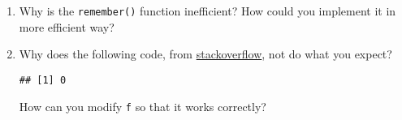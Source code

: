 \begin{enumerate}
\begin{Shaded}
\begin{Highlighting}[]
\StringTok{ }\NormalTok{(}\NormalTok{(}\NormalTok{, }\NormalTok{(}
\StringTok{ }\NormalTok{(}\NormalTok{, }\NormalTok{(}\NormalTok{(}
\StringTok{ }\NormalTok{(}\NormalTok{, }\NormalTok{(}\NormalTok{, }
\end{Highlighting}
\end{Shaded}
\item
  Why is the \texttt{remember()} function inefficient? How could you
  implement it in more efficient way?
\item
  Why does the following code, from
  \href{http://stackoverflow.com/questions/8440675}{stackoverflow}, not
  do what you expect?

\begin{Shaded}
\begin{Highlighting}[]
\StringTok{ }\OperatorTok{*}\StringTok{ }\OperatorTok{+}\StringTok{ }

\StringTok{ } \NormalTok{(}\NormalTok{, }\NormalTok{), } \NormalTok{(}\NormalTok{, }\NormalTok{))}

\NormalTok{fs[[}\NormalTok{]](}\NormalTok{)}
\end{Highlighting}
\end{Shaded}

\begin{verbatim}
## [1] 0
\end{verbatim}

\begin{Shaded}
\begin{Highlighting}[]
\end{Highlighting}
\end{Shaded}

  How can you modify \texttt{f} so that it works correctly?
\end{enumerate}


